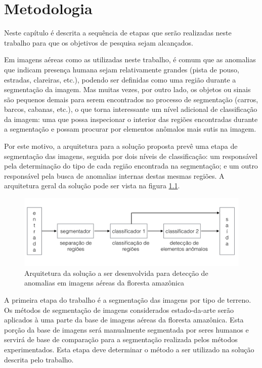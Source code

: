 \chapter{Metodologia}\label{cap:metodologia}

Neste capítulo é descrita a sequência de etapas que serão realizadas neste trabalho para que os objetivos de pesquisa sejam alcançados.

Em imagens aéreas como as utilizadas neste trabalho, é comum que as anomalias que indicam presença humana sejam relativamente grandes (pista de pouso, estradas, clareiras, etc.), podendo ser definidas como uma região durante a segmentação da imagem. Mas muitas vezes, por outro lado, os objetos ou sinais são pequenos demais para serem encontrados no processo de segmentação (carros, barcos, cabanas, etc.), o que torna interessante um nível adicional de classificação da imagem: uma que possa inspecionar o interior das regiões encontradas durante a segmentação e possam procurar por elementos anômalos mais sutis na imagem.

Por este motivo, a arquitetura para a solução proposta prevê uma etapa de segmentação das imagens, seguida por dois níveis de classificação: um responsável pela determinação do tipo de cada região encontrada na segmentação; e um outro responsável pela busca de anomalias internas destas mesmas regiões. A arquitetura geral da solução pode ser vista na figura \ref{fig:metDiagrama}.

\begin{figure}[h]
    \includegraphics[width=\textwidth]{imgs/arquitetura}
    \caption{Arquitetura da solução a ser desenvolvida para detecção de anomalias em imagens aéreas da floresta amazônica}
    \label{fig:metDiagrama}
\end{figure}

A primeira etapa do trabalho é a segmentação das imagens por tipo de terreno. Os métodos de segmentação de imagens considerados estado-da-arte serão aplicados à uma parte da base de imagens aéreas da floresta amazônica. Esta porção da base de imagens será manualmente segmentada por seres humanos e servirá de base de comparação para a segmentação realizada pelos métodos experimentados. Esta etapa deve determinar o método a ser utilizado na solução descrita pelo trabalho.

